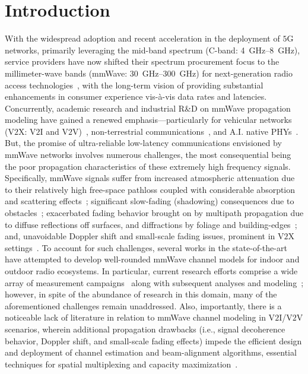 \documentclass[12pt, draftcls, onecolumn]{IEEEtran}
\begin{document}
\section{Introduction}\label{S1}
With the widespread adoption and recent acceleration in the deployment of $5$G networks, primarily leveraging the mid-band spectrum (C-band: \SIrange{4}{8}{\giga\hertz}), service providers have now shifted their spectrum procurement focus to the millimeter-wave bands (mmWave: \SIrange{30}{300}{\giga\hertz}) for next-generation radio access technologies~\cite{mmWaveSurvey, Commercial, 5GBSurvey, 6GSurvey}, with the long-term vision of providing substantial enhancements in consumer experience vis-\`{a}-vis data rates and latencies. Concurrently, academic research and industrial R\&D on mmWave propagation modeling have gained a renewed emphasis---particularly for vehicular networks (V$2$X: V$2$I and V$2$V)~\cite{VehicularBeamSelection, CVBeamAlignmentV2X}, non-terrestrial communications~\cite{mmWaveRuralNTNOpportunities, UAVBeamTracking}, and A.I. native PHYs~\cite{6GAINative, OTAGANs}. But, the promise of ultra-reliable low-latency communications envisioned by mmWave networks involves numerous challenges, the most consequential being the poor propagation characteristics of these extremely high frequency signals. Specifically, mmWave signals suffer from increased atmospheric attenuation due to their relatively high free-space pathloss coupled with considerable absorption and scattering effects~\cite{Rappaport}; significant slow-fading (shadowing) consequences due to obstacles~\cite{SuburbanGeometryJournal}; exacerbated fading behavior brought on by multipath propagation due to diffuse reflections off surfaces, and diffractions by foliage and building-edges~\cite{Outdoor28G}; and, unavoidable Doppler shift and small-scale fading issues, prominent in V$2$X settings~\cite{V2XBlockages}. To account for such challenges, several works in the state-of-the-art have attempted to develop well-rounded mmWave channel models for indoor and outdoor radio ecosystems. In particular, current research efforts comprise a wide array of measurement campaigns~\cite{Purdue, Foliage, AgileLink, Harvard, Outdoor28G, Indoor60G, PDAPs, MolischSpatialIndoorOutdoor, DopplerHST} along with subsequent analyses and modeling~\cite{SuburbanGeometryJournal, FoliageSimulations, Indoor60G, Qualcomm3GPP, MacCartneyModelsOverview, SpatialConsistencyOriginal, MacCartneyRural, MolischEstimate, NISTModeling, QDC_NIST, D2DHumanBlockage}; however, in spite of the abundance of research in this domain, many of the aforementioned challenges remain unaddressed. Also, importantly, there is a noticeable lack of literature in relation to mmWave channel modeling in V$2$I/V$2$V scenarios, wherein additional propagation drawbacks (i.e., signal decoherence behavior, Doppler shift, and small-scale fading effects) impede the efficient design and deployment of channel estimation and beam-alignment algorithms, essential techniques for spatial multiplexing and capacity maximization~\cite{VehicularBeamSelection, CVBeamAlignmentV2X}. 
\end{document}
